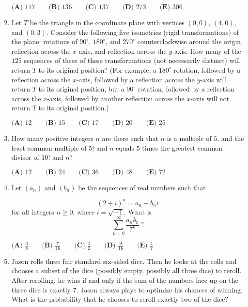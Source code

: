 \documentclass{article}
\begin{document}
\begin{enumerate}[label=\arabic*., itemsep=0.5em]
$\textbf{(A) } 117 \qquad \textbf{(B) } 136 \qquad \textbf{(C) } 137 \qquad \textbf{(D) } 273 \qquad \textbf{(E) } 306$\par \vspace{0.5em}\item Let $T$ be the triangle in the coordinate plane with vertices $\left(0,0\right)$, $\left(4,0\right)$, and $\left(0,3\right)$. Consider the following five isometries (rigid transformations) of the plane: rotations of $90^{\circ}$, $180^{\circ}$, and $270^{\circ}$ counterclockwise around the origin, reflection across the $x$-axis, and reflection across the $y$-axis. How many of the $125$ sequences of three of these transformations (not necessarily distinct) will return $T$ to its original position? (For example, a $180^{\circ}$ rotation, followed by a reflection across the $x$-axis, followed by a reflection across the $y$-axis will return $T$ to its original position, but a $90^{\circ}$ rotation, followed by a reflection across the $x$-axis, followed by another reflection across the $x$-axis will not return $T$ to its original position.)

$\textbf{(A) } 12\qquad\textbf{(B) } 15\qquad\textbf{(C) }17 \qquad\textbf{(D) }20 \qquad\textbf{(E) }25$\par \vspace{0.5em}\item How many positive integers $n$ are there such that $n$ is a multiple of $5$, and the least common multiple of $5!$ and $n$ equals $5$ times the greatest common divisor of $10!$ and $n?$

$\textbf{(A) } 12 \qquad \textbf{(B) } 24 \qquad \textbf{(C) } 36 \qquad \textbf{(D) } 48 \qquad \textbf{(E) } 72$\par \vspace{0.5em}\item Let $(a_n)$ and $(b_n)$ be the sequences of real numbers such that

\begin{equation*}
(2 + i)^n = a_n + b_ni
\end{equation*}
for all integers $n\geq 0$, where $i = \sqrt{-1}$. What is
\begin{equation*}
\sum_{n=0}^\infty\frac{a_nb_n}{7^n}\,?
\end{equation*}

$\textbf{(A) }\frac 38\qquad\textbf{(B) }\frac7{16}\qquad\textbf{(C) }\frac12\qquad\textbf{(D) }\frac9{16}\qquad\textbf{(E) }\frac47$\par \vspace{0.5em}\item Jason rolls three fair standard six-sided dice. Then he looks at the rolls and chooses a subset of the dice (possibly empty, possibly all three dice) to reroll. After rerolling, he wins if and only if the sum of the numbers face up on the three dice is exactly $7$. Jason always plays to optimize his chances of winning. What is the probability that he chooses to reroll exactly two of the dice?


\end{enumerate}
\end{document}
